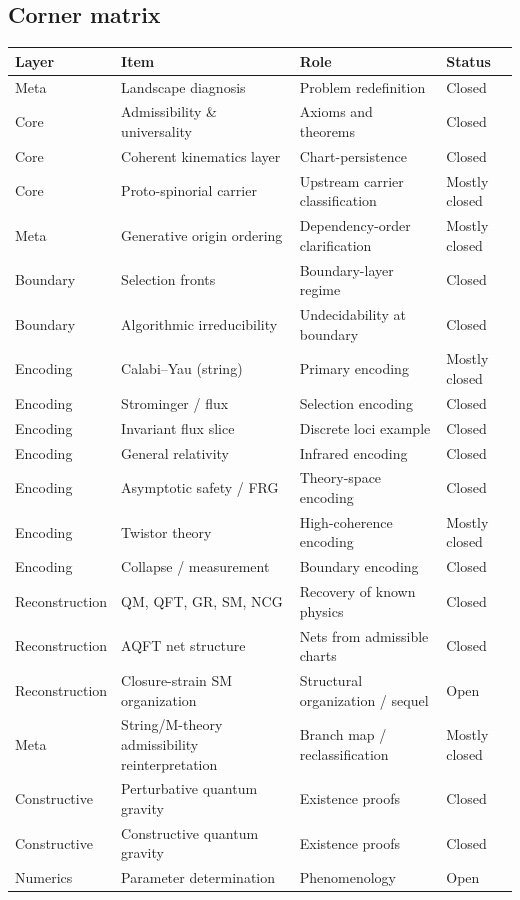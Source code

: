 \documentclass[11pt]{article}
\begin{document}
\subsection{Corner matrix}

\begin{center}
\begin{tabular}{|l|l|l|l|}
\hline
\textbf{Layer} & \textbf{Item} & \textbf{Role} & \textbf{Status} \\
\hline
Meta & Landscape diagnosis & Problem redefinition & Closed \\
\hline
Core & Admissibility \& universality & Axioms and theorems & Closed \\
\hline

Core & Coherent kinematics layer & Chart-persistence & Closed \\
\hline
Core & Proto-spinorial carrier & Upstream carrier classification & Mostly closed \\
\hline
Meta & Generative origin ordering & Dependency-order clarification & Mostly closed \\

\hline
Boundary & Selection fronts & Boundary-layer regime & Closed \\
\hline
Boundary & Algorithmic irreducibility & Undecidability at boundary & Closed \\
\hline
Encoding & Calabi--Yau (string) & Primary encoding & Mostly closed \\
\hline
Encoding & Strominger / flux & Selection encoding & Closed \\
\hline
Encoding & Invariant flux slice & Discrete loci example & Closed \\
\hline
Encoding & General relativity & Infrared encoding & Closed \\
\hline
Encoding & Asymptotic safety / FRG & Theory-space encoding & Closed \\
\hline
Encoding & Twistor theory & High-coherence encoding & Mostly closed \\
\hline
Encoding & Collapse / measurement & Boundary encoding & Closed \\
\hline
Reconstruction & QM, QFT, GR, SM, NCG & Recovery of known physics & Closed \\
\hline
Reconstruction & AQFT net structure & Nets from admissible charts  & Closed\\
\hline
Reconstruction & Closure-strain SM organization & Structural organization / sequel & Open\\
\hline
Meta & String/M-theory admissibility reinterpretation & Branch map / reclassification & Mostly closed\\
\hline

Constructive & Perturbative quantum gravity & Existence proofs & Closed \\
\hline
Constructive & Constructive quantum gravity & Existence proofs & Closed \\
\hline
Numerics & Parameter determination & Phenomenology & Open \\
\hline
\end{tabular}
\end{center}
\end{document}

